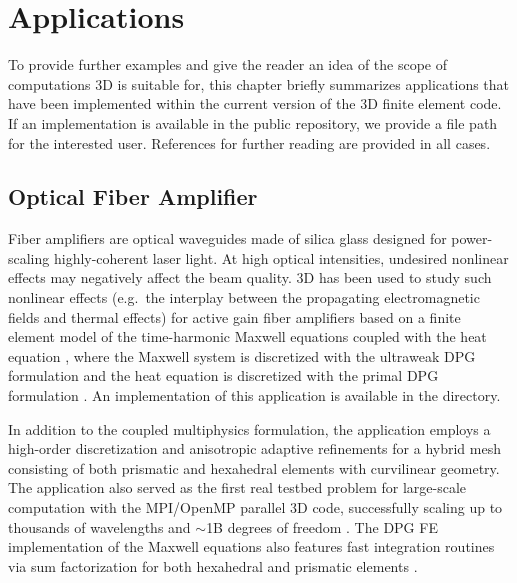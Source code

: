 %
%

\chapter{Applications}
\label{chap:applications}


To provide further examples and give the reader an idea of the scope of computations \hp3D is suitable for, this chapter briefly summarizes applications that have been implemented within the current version of the \hp3D finite element code. If an implementation is available in the public repository, we provide a file path for the interested user. References for further reading are provided in all cases.

\section{Optical Fiber Amplifier}
\label{sec:laser}

Fiber amplifiers are optical waveguides made of silica glass designed for power-scaling highly-coherent laser light. At high optical intensities, undesired nonlinear effects may negatively affect the beam quality. \hp3D has been used to study such nonlinear effects (e.g.~the interplay between the propagating electromagnetic fields and thermal effects) for active gain fiber amplifiers based on a finite element model of the time-harmonic Maxwell equations coupled with the heat equation \cite{henneking2021fiber,nagaraj2018raman}, where the Maxwell system is discretized with the ultraweak DPG formulation \cite{carstensen2016breaking} and the heat equation is discretized with the primal DPG formulation \cite{roberts2021time}. An implementation of this application is available in the  directory. 

In addition to the coupled multiphysics formulation, the application employs a high-order discretization and anisotropic adaptive refinements \cite{henneking2021pollution} for a hybrid mesh consisting of both prismatic and hexahedral elements with curvilinear geometry. The application also served as the first real testbed problem for large-scale computation with the MPI/OpenMP parallel \hp3D code, successfully scaling up to thousands of wavelengths and $\sim$1B degrees of freedom \cite{henneking2021phd,henneking2022parallel}. The DPG FE implementation of the Maxwell equations also features fast integration routines via sum factorization for both hexahedral and prismatic elements \cite{mora2019fast,badger2020fast}.

